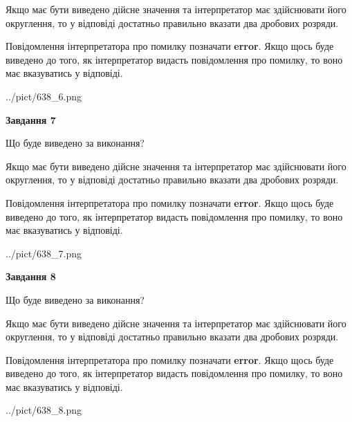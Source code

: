 \documentclass[12pt, ukrainian]{article}
\begin{document}
{\begin {Large}
Якщо має бути виведено дійсне значення та інтерпретатор має здійснювати його округлення, 
то у відповіді достатньо правильно вказати два дробових розряди.

Повідомлення інтерпретатора про помилку позначати \textbf{error}.
Якщо щось буде виведено до того, як інтерпретатор видасть повідомлення про помилку, 
то воно має вказуватись у відповіді. \par

\begin{center}
	{../pict/638_6.png}
\end{center}
\newpage

{\begin {center}\textbf{Завдання 7}\end {center}}\par
Що буде виведено за виконання? \par

Якщо має бути виведено дійсне значення та інтерпретатор має здійснювати його округлення, 
то у відповіді достатньо правильно вказати два дробових розряди.

Повідомлення інтерпретатора про помилку позначати \textbf{error}.
Якщо щось буде виведено до того, як інтерпретатор видасть повідомлення про помилку, 
то воно має вказуватись у відповіді. \par

\begin{center}
	{../pict/638_7.png}
\end{center}
\newpage

{\begin {center}\textbf{Завдання 8}\end {center}}\par
Що буде виведено за виконання? \par

Якщо має бути виведено дійсне значення та інтерпретатор має здійснювати його округлення, 
то у відповіді достатньо правильно вказати два дробових розряди.

Повідомлення інтерпретатора про помилку позначати \textbf{error}.
Якщо щось буде виведено до того, як інтерпретатор видасть повідомлення про помилку, 
то воно має вказуватись у відповіді. \par

\begin{center}
	{../pict/638_8.png}
\end{center}
\newpage


\end{Large}}
\end{document}
